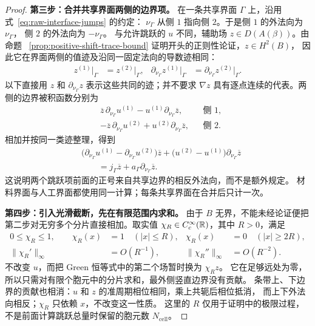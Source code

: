 \begin{proof}
  \smallskip\noindent
  \textbf{第三步：合并共享界面两侧的边界项。}
  在一条共享界面 $\Gamma$ 上，沿用式~\eqref{eq:raw-interface-jumps} 的约定：
  $\nu_\Gamma$ 从侧 $1$ 指向侧 $2$。于是侧 $1$ 的外法向为 $\nu_\Gamma$，
  侧 $2$ 的外法向为 $-\nu_\Gamma$。
  与允许跳跃的 $u$ 不同，辅助场 $z\in D(A(\beta))$。由命题
  ~\ref{prop:positive-shift-trace-bound} 证明开头的正则性论证，$z\in H^2(B)$，
  因此它在界面两侧的值迹及沿同一固定法向的导数迹相同：
  \begin{align*}
    z^{(1)}|_\Gamma&=z^{(2)}|_\Gamma, &
    \partial_{\nu_\Gamma}z^{(1)}|_\Gamma
      &=\partial_{\nu_\Gamma}z^{(2)}|_\Gamma.
  \end{align*}
  以下直接用 $z$ 和 $\partial_{\nu_\Gamma}z$ 表示这些共同的迹；并不要求
  $\nabla z$ 具有逐点连续的代表。两侧的边界被积函数分别为
  \begin{align*}
    &\overline z\,\partial_{\nu_\Gamma}u^{(1)}
      -u^{(1)}\partial_{\nu_\Gamma}\overline z,
      &&\text{侧 $1$},\\
    &-\overline z\,\partial_{\nu_\Gamma}u^{(2)}
      +u^{(2)}\partial_{\nu_\Gamma}\overline z,
      &&\text{侧 $2$}.
  \end{align*}
  相加并按同一类迹整理，得到
  \begin{align*}
    &\bigl(\partial_{\nu_\Gamma}u^{(1)}
        -\partial_{\nu_\Gamma}u^{(2)}\bigr)\overline z
      +\bigl(u^{(2)}-u^{(1)}\bigr)
        \partial_{\nu_\Gamma}\overline z\\
    &\qquad=j_\Gamma\overline z
      +a_\Gamma\partial_{\nu_\Gamma}\overline z.
  \end{align*}
  这说明两个跳跃项前面的正号来自共享边界的相反外法向，而不是额外规定。
  材料界面与人工界面都使用同一计算；每条共享界面在合并后只计一次。

  \smallskip\noindent
  \textbf{第四步：引入光滑截断，先在有限范围内求和。}
  由于 $B$ 无界，不能未经论证便把第二步对无穷多个分片直接相加。取实值
  $\chi_R\in C_c^\infty(\mathbb{R})$，其中 $R>0$，满足
  \begin{align*}
    0\leq\chi_R\leq1,\qquad
    \chi_R(x)&=1\quad(|x|\leq R), &
    \chi_R(x)&=0\quad(|x|\geq2R),\\
    \|\chi_R'\|_\infty&=O(R^{-1}), &
    \|\chi_R''\|_\infty&=O(R^{-2}).
  \end{align*}
  不改变 $u$，而把 Green 恒等式中的第二个场暂时换为 $\chi_Rz$。
  它在足够远处为零，所以只需对有限个胞元中的分片求和，最外侧竖直边界没有贡献。
  条带上、下边界的贡献也相消：$u$ 和 $z$ 的准周期相位相同，乘上共轭后相位抵消，
  而上下外法向相反；$\chi_R$ 只依赖 $x$，不改变这一性质。
  这里的 $R$ 仅用于证明中的极限过程，不是前面计算跳跃总量时保留的胞元数
  $N_{\mathrm{cell}}$。


\end{proof}
